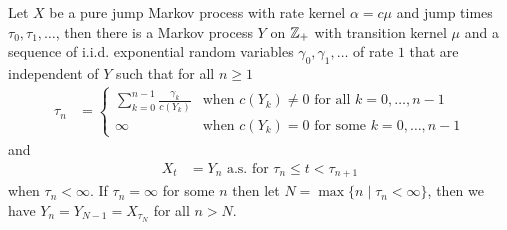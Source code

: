 \begin{thm}Let $X$ be a pure jump Markov process with rate kernel
  $\alpha=c\mu$ and jump times $\tau_0, \tau_1, \dotsc$, then there is a Markov process $Y$ on $\mathbb{Z}_+$ with transition kernel $\mu$
  and a
  sequence of i.i.d. exponential random variables $\gamma_0, \gamma_1,
  \dotsc$ of rate $1$ that are independent of $Y$ such that for all $n
  \geq 1$ 
\begin{align*}
\tau_n &= \begin{cases}
\sum_{k=0}^{n-1} \frac{\gamma_k}{c(Y_k)} &\text{when $c(Y_k)
  \neq 0$ for all $k=0, \dotsc, n-1$} \\
\infty & \text{when $c(Y_k) = 0$ for some $k=0, \dotsc, n-1$}
\end{cases}
\end{align*}
and
\begin{align*}
X_t &= Y_n  \text{ a.s. for $\tau_n \leq t < \tau_{n+1}$}
\end{align*} 
when $\tau_n < \infty$.  If $\tau_n = \infty$ for some $n$ then let
$N = \max \lbrace n \mid \tau_n < \infty \rbrace$, then we have $Y_n =
Y_{N-1} = X_{\tau_{N}}$ for all $n > N$.
\end{thm}

